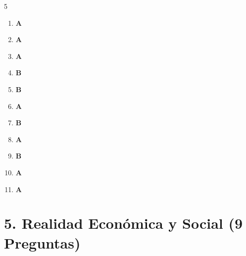 \documentclass[10pt,a4paper]{article}
\begin{document}
\begin{tcolorbox}[colback=gray!5!white,colframe=gray!60!black,title=\textbf{CLAVE DE RESPUESTAS -- GEOGRAFÍA DE EL SALVADOR Y CENTROAMÉRICA}]
\begin{multicols}{5}
\begin{enumerate}[label=\textbf{\arabic*.}]
  \item \textbf{A}
  \item \textbf{A}
  \item \textbf{A}
  \item \textbf{B}
  \item \textbf{B}
  \item \textbf{A}
  \item \textbf{B}
  \item \textbf{A}
  \item \textbf{B}
  \item \textbf{A}
  \item \textbf{A}
\end{enumerate}
\end{multicols}
\end{tcolorbox}
\newpage\n
\section{5. Realidad Económica y Social (9 Preguntas)}
\end{document}
